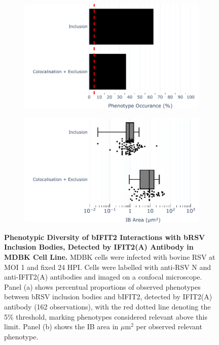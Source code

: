 \begin{figure}
    \begin{subfigure}{0.495\textwidth}
        \caption{}
        \includegraphics[width=1\linewidth]{08. Chapter 3/Figs/02. Infection/02. IFIT2/01. IFIT2A/13. bar_i2a_mdbk.pdf} 
    \end{subfigure}
    \begin{subfigure}{0.495\textwidth}
        \caption{}
        \includegraphics[width=1\linewidth]{08. Chapter 3/Figs/02. Infection/02. IFIT2/01. IFIT2A/14. box_i2a_mdbk.pdf}
    \end{subfigure}
    \caption[Phenotypic Diversity of bIFIT2 Interactions with bRSV Inclusion Bodies, Detected by IFIT2(A) Antibody in MDBK Cell Line.]{\textbf{Phenotypic Diversity of bIFIT2 Interactions with bRSV Inclusion Bodies, Detected by IFIT2(A) Antibody in MDBK Cell Line.} MDBK cells were infected with bovine RSV at MOI 1 and fixed 24 HPI. Cells were labelled with anti-RSV N and anti-IFIT2(A) antibodies and imaged on a confocal microscope. Panel (a) shows percentual proportions of observed phenotypes between bRSV inclusion bodies and bIFIT2, detected by IFIT2(A) antibody (162 observations), with the red dotted line denoting the 5\% threshold, marking phenotypes considered relevant above this limit. Panel (b) shows the IB area in \(\mu \mbox{m}^2\) per observed relevant phenotype.}
    \label{fig:Phenotypic Diversity of bIFIT2 Interactions with bRSV Inclusion Bodies, Detected by IFIT2(A) Antibody in MDBK Cell Line}
\end{figure}

